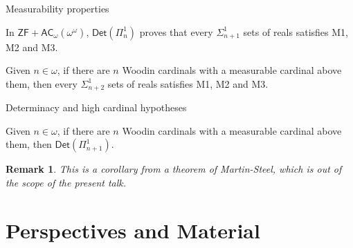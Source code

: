 \documentclass{beamer} %
\newtheorem{remark}[theorem]{Remark}
\begin{document}

\begin{frame}{Measurability properties}

    \begin{theorem}
        In $\mathsf{ZF + AC}_{\omega}(\omega^{\omega})$, $\mathsf{Det}(\Pi^1_n)$ proves that 
        every $\Sigma^1_{n+1}$ sets of reals satisfies M1, M2 and M3.
    \end{theorem}

    \begin{theorem}
        Given $n \in \omega$, if there are $n$ Woodin cardinals with a measurable cardinal above 
        them, then every $\Sigma^1_{n+2}$ sets of reals satisfies M1, M2 and M3.
    \end{theorem}
\end{frame}


\begin{frame}{Determinacy and high cardinal hypotheses}
    \begin{theorem}
        Given $n \in \omega$, if there are $n$ Woodin cardinals with a measurable cardinal above 
        them, then $\mathsf{Det}(\Pi^1_{n+1})$.
    \end{theorem}

    \begin{remark}
        This is a corollary from a theorem of Martin-Steel, which is out of the scope of the 
        present talk.
    \end{remark} 
\end{frame}


\section{Perspectives and Material}

\begin{frame}
    
\end{frame}

\end{document}
